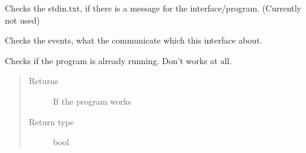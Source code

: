 \documentclass[letterpaper,10pt,english]{sphinxmanual}
\begin{document}
\begin{fulllineitems}
\begin{fulllineitems}
\label{\detokenize{anoog.automation:anoog.automation.py_exe_interface.Process_Interface.check_input}}
\sphinxAtStartPar
Checks the stdin.txt, if there is a message for the interface/program.
(Currently not used)

\end{fulllineitems}


\begin{fulllineitems}
\label{\detokenize{anoog.automation:anoog.automation.py_exe_interface.Process_Interface.event_listener}}
\sphinxAtStartPar
Checks the events, what the {\hyperref[\detokenize{anoog.automation:anoog.automation.controller.Terminal}]{}} communicate which this interface about.

\end{fulllineitems}


\begin{fulllineitems}
\label{\detokenize{anoog.automation:anoog.automation.py_exe_interface.Process_Interface.is_alive}}
\sphinxAtStartPar
Checks if the program is already running.
Don’t works at all.
\begin{quote}\begin{description}
\item[{Returns}] \leavevmode
\sphinxAtStartPar
If the program works

\item[{Return type}] \leavevmode
\sphinxAtStartPar
bool

\end{description}\end{quote}

\end{fulllineitems}



\end{fulllineitems}
\end{document}

